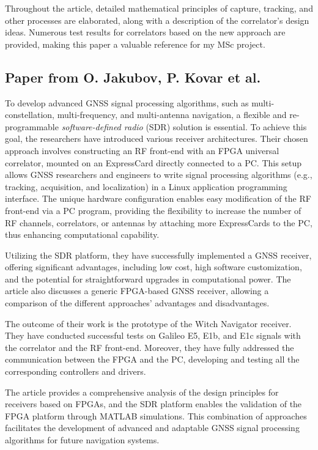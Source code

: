 Throughout the article, detailed mathematical principles of capture, tracking, and other processes are elaborated, along with a description of the correlator's design ideas. Numerous test results for correlators based on the new approach are provided, making this paper a valuable reference for my MSc project.

\subsection{Paper from O. Jakubov, P. Kovar et al.\texorpdfstring{\cite{RN155}}{}}
To develop advanced GNSS signal processing algorithms, such as multi-constellation, multi-frequency, and multi-antenna navigation, a flexible and re-programmable \textit{software-defined radio} (SDR) solution is essential. To achieve this goal, the researchers have introduced various receiver architectures. Their chosen approach involves constructing an RF front-end with an FPGA universal correlator, mounted on an ExpressCard directly connected to a PC. This setup allows GNSS researchers and engineers to write signal processing algorithms (e.g., tracking, acquisition, and localization) in a Linux application programming interface. The unique hardware configuration enables easy modification of the RF front-end via a PC program, providing the flexibility to increase the number of RF channels, correlators, or antennas by attaching more ExpressCards to the PC, thus enhancing computational capability.

Utilizing the SDR platform, they have successfully implemented a GNSS receiver, offering significant advantages, including low cost, high software customization, and the potential for straightforward upgrades in computational power. The article also discusses a generic FPGA-based GNSS receiver, allowing a comparison of the different approaches' advantages and disadvantages.

The outcome of their work is the prototype of the Witch Navigator receiver. They have conducted successful tests on Galileo E5, E1b, and E1c signals with the correlator and the RF front-end. Moreover, they have fully addressed the communication between the FPGA and the PC, developing and testing all the corresponding controllers and drivers.

The article provides a comprehensive analysis of the design principles for receivers based on FPGAs, and the SDR platform enables the validation of the FPGA platform through MATLAB simulations. This combination of approaches facilitates the development of advanced and adaptable GNSS signal processing algorithms for future navigation systems.

